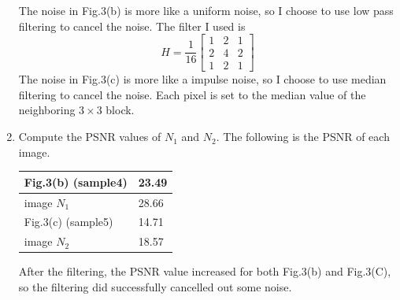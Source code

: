 \documentclass[12pt,a4paper,notitlepage,oneside,amsmath,amssymb]{article}
\begin{document}
\begin{CJK*}{UTF8}{bkai}
\begin{enumerate}[label=(\alph*)]
          The noise in Fig.3(b) is more like a uniform noise, so I choose to use low pass filtering to cancel the noise. The filter I used is
          \[
            H = \frac{1}{16}
            \begin{bmatrix}
              1 & 2 & 1 \\
              2 & 4 & 2 \\
              1 & 2 & 1
            \end{bmatrix}
          \]
          The noise in Fig.3(c) is more like a impulse noise, so I choose to use median filtering to cancel the noise.
          Each pixel is set to the median value of the neighboring \(3 \times 3\) block.

    \item Compute the PSNR values of \(N_1\) and \(N_2\). The following is the PSNR of each image.

          \vspace{0.5ex}

          \begin{tabular}{ l | l }
            Fig.3(b) (sample4) & 23.49 \\
            \hline
            image \(N_1\)      & 28.66 \\
            \hline\hline
            Fig.3(c) (sample5) & 14.71 \\
            \hline
            image \(N_2\)      & 18.57
          \end{tabular}

          After the filtering, the PSNR value increased for both Fig.3(b) and Fig.3(C), so the filtering did successfully cancelled out some noise.

  \end{enumerate}

  \clearpage
\end{CJK*}
\end{document}
